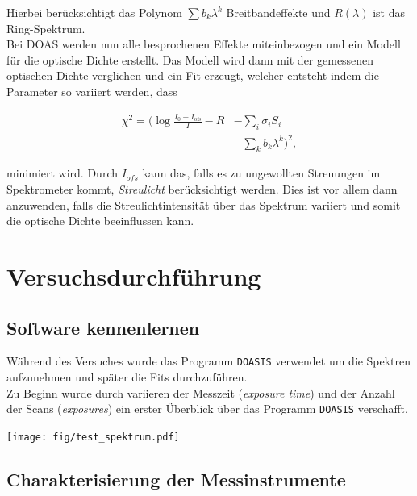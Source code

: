 \documentclass[12pt, a4paper, bibliography=totoc]{scrartcl}
\begin{document}
\begin{multicols}{2}
Hierbei berücksichtigt das Polynom $\sum b_k \lambda^k$ Breitbandeffekte und $R(\lambda)$ ist das Ring-Spektrum.\\
Bei DOAS werden nun alle besprochenen Effekte miteinbezogen und ein Modell für die optische Dichte erstellt. 
Das Modell wird dann mit der gemessenen optischen Dichte verglichen und ein Fit erzeugt, welcher entsteht indem die Parameter so variiert werden, dass 

\begin{align*}
    \chi^2 = ( \log \frac{I_0 + I_\text{ofs}}{I} - R & - \sum_i \sigma_i S_i \\ 
    & - \sum_k b_k \lambda^k )^2 ,
\end{align*}

minimiert wird. Durch $I_{ofs}$ kann das, falls es zu ungewollten Streuungen im Spektrometer kommt, \textit{Streulicht} berücksichtigt werden. Dies ist vor allem dann anzuwenden, falls die Streulichtintensität über das Spektrum variiert und somit die optische Dichte beeinflussen kann.  

\section{Versuchsdurchführung}\label{sec:versuchsdurchführung}

\subsection{Software kennenlernen}\label{get_to_know_the_software}

Während des Versuches wurde das Programm \verb*+DOASIS+ verwendet um die Spektren aufzunehmen und später die Fits durchzuführen.\\
Zu Beginn wurde durch variieren der Messzeit (\textit{exposure time}) und der Anzahl der Scans (\textit{exposures}) ein erster Überblick über das Programm \verb*+DOASIS+ verschafft.

\begin{center}
	\texttt{[image: fig/test\_spektrum.pdf]}
	\label{fig:test_spectrum}

\end{center}

\subsection{Charakterisierung der Messinstrumente}\label{ssec:characteristic_of_the_instruments}


\end{multicols}
\end{document}
